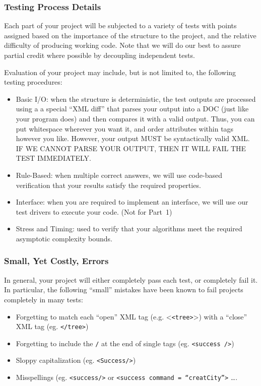 \documentclass[12pt]{article}
\begin{document}
\subsubsection{Testing Process Details}


Each part of your project will be subjected to  a variety of
 tests with points assigned based  on the importance of the
structure to the project, and the relative difficulty of
producing working code. Note that we will do our best to assure
 partial credit where possible by decoupling independent tests. 


Evaluation of your  project  may include, but is not limited to,  the
following testing procedures:

\begin{itemize}

  \item Basic I/O:  when the structure is deterministic, the  test outputs are processed using a
              a special ``XML diff'' that parses your
       output into a DOC (just
like your program does) and then compares it with a valid output.
       Thus,
you can put whitespace wherever you want it, and order attributes
       within tags
however you like.  However, your output MUST be syntactically valid
       XML.  IF
WE CANNOT PARSE YOUR OUTPUT, THEN IT WILL FAIL THE TEST IMMEDIATELY.

\item Rule-Based: when multiple correct answers, we will use
       code-based verification  that your results  satisfy the
       required properties.
 \item Interface: when you are required to implement an interface, we
       will use our test drivers to execute your code. (Not for Part~1)
 \item Stress and Timing: used to verify that your algorithms meet the
       required asymptotic complexity bounds.
\end{itemize}

\subsubsection{Small, Yet Costly, Errors}
In general, your project will either completely pass each test, or
completely
fail it.  In particular, the following ``small'' mistakes have been
known to
fail projects completely in many tests:

\begin{itemize}
  \item Forgetting to match each ``open'' XML tag (e.g. <\texttt{<tree>}>) with
        a ``close'' XML
tag (eg. \texttt{</tree>})
  \item Forgetting to include the \texttt{/} at the end of single tags
        (eg. \texttt{<success />})
  \item Sloppy capitalization (eg. \texttt{<Success/>})

  \item Misspellings     (eg. \texttt{<success/>} or \texttt{<success
        command = ``creatCity''>}  \ldots.
\end{itemize}
\end{document}
